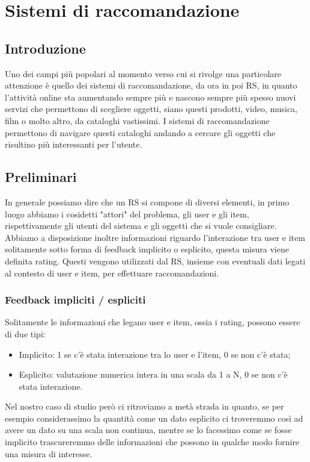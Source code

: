 
\hypertarget{(chap:capitolo3)}{}
\chapter{Sistemi di raccomandazione}
\section{Introduzione}
Uno dei campi più popolari al momento verso cui si rivolge una particolare attenzione è quello dei sistemi di raccomandazione, da ora in poi RS, in quanto l'attività online sta aumentando sempre più e nascono sempre più spesso nuovi servizi che permettono di scegliere oggetti, siano questi prodotti, video, musica, film o molto altro, da cataloghi vastissimi. I sistemi di raccomandazione permettono di navigare questi cataloghi andando a cercare gli oggetti che risultino più interessanti per l'utente.

\section{Preliminari}
In generale possiamo dire che un RS si compone di diversi elementi, in primo luogo abbiamo i cosidetti "attori" del problema, gli user e gli item, rispettivamente gli utenti del sistema e gli oggetti che si vuole consigliare. Abbiamo a disposizione inoltre informazioni riguardo l'interazione tra user e item solitamente sotto forma di feedback implicito o esplicito, questa misura viene definita rating. Questi vengono utilizzati dal RS, insieme con eventuali dati legati al contesto di user e item, per effettuare raccomandazioni.

\subsection{Feedback impliciti / espliciti}
Solitamente le informazioni che legano user e item, ossia i rating, possono essere di due tipi:
\begin{itemize}
	\item Implicito: 1 se c'è stata interazione tra lo user e l'item, 0 se non c'è stata;
	\item Esplicito: valutazione numerica intera in una scala da 1 a N, 0 se non c'è stata interazione.
\end{itemize}

Nel nostro caso di studio però ci ritroviamo a metà strada in quanto, se per esempio considerassimo la quantità come un dato esplicito ci troveremmo così ad avere un dato su una scala non continua, mentre se lo facessimo come se fosse implicito trascureremmo delle informazioni che possono in qualche modo fornire una misura di interesse.

